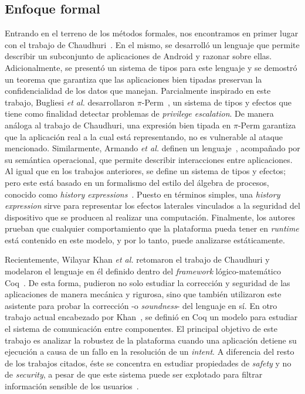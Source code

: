 \subsection*{Enfoque formal}
Entrando en el terreno de los métodos formales, nos encontramos en primer lugar
con el trabajo de Chaudhuri~\cite{chaudhuri}. En el mismo, se desarrolló un
lenguaje que permite describir un subconjunto de aplicaciones de Android y
razonar sobre ellas. Adicionalmente, se presentó un sistema de tipos para este
lenguaje y se demostró un teorema que garantiza que las aplicaciones bien
tipadas preservan la confidencialidad de los datos que manejan. Parcialmente
inspirado en este trabajo, Bugliesi \textit{et al.} desarrollaron
$\pi$-Perm~\cite{bugliesi}, un sistema de tipos y efectos que tiene como
%
%
finalidad detectar problemas de \textit{privilege escalation}. De manera análoga
al trabajo de Chaudhuri, una expresión bien tipada en $\pi$-Perm garantiza que
la aplicación real a la cual está representando, no es vulnerable al ataque
mencionado. Similarmente, Armando \textit{et al.} definen un
lenguaje~\cite{armando}, acompañado por su semántica operacional, que permite
describir interacciones entre aplicaciones. Al igual que en los trabajos
anteriores, se define un sistema de tipos y efectos; pero este está basado en un
formalismo del estilo del álgebra de procesos, conocido como \textit{history
expressions}~\cite{history-expressions}. Puesto en términos simples, una
\textit{history expression} sirve para representar los efectos laterales
vinculados a la seguridad del dispositivo que se producen al realizar una
computación. Finalmente, los autores prueban que cualquier comportamiento que la
plataforma pueda tener en \textit{runtime} está contenido en este modelo, y por
lo tanto, puede analizarse estáticamente.

Recientemente, Wilayar Khan \textit{et al.} retomaron el trabajo de Chaudhuri y
modelaron el lenguaje en él definido dentro del \textit{framework}
lógico-matemático Coq~\cite{coq}. De esta forma, pudieron no solo estudiar la
corrección y seguridad de las aplicaciones de manera mecánica y rigurosa, sino
que también utilizaron este asistente para probar la corrección -o
\textit{soundness}- del lenguaje en sí. En otro trabajo actual encabezado por
Khan~\cite{crashsafe}, se definió en Coq un modelo para estudiar el sistema de
comunicación entre componentes. El principal objetivo de este trabajo es
analizar la robustez de la plataforma cuando una aplicación detiene su ejecución
a causa de un fallo en la resolución de un \textit{intent}. A diferencia del
resto de los trabajos citados, éste se concentra en estudiar propiedades de
\textit{safety} y no de \textit{security}, a pesar de que este sistema puede ser
explotado para filtrar información sensible de los usuarios~\cite{iccta}.

